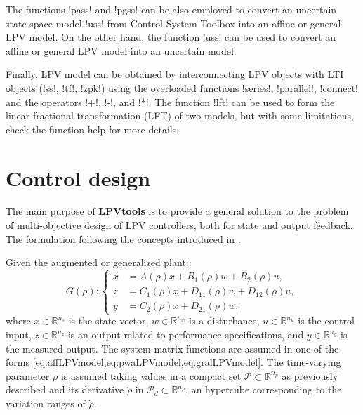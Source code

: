 \documentclass[fleqn,11pt]{article}
\newcommand{\p}{\rho}
\newcommand{\Rset}{\mathbb{R}}
\newcommand{\Pset}{\mathcal{P}}
\newcommand{\Pdset}{\mathcal{P}_d}
\newcommand{\lpvtool}{\textbf{LPVtools}\xspace}
\begin{document}
The functions !pass! and !pgss! can be also employed to convert an uncertain state-space model !uss! from Control System Toolbox into an affine or general LPV model. On the other hand, the function !uss! can be used to convert an affine or general LPV model into an uncertain model.

Finally, LPV model can be obtained by interconnecting LPV objects with LTI objects (!ss!, !tf!, !zpk!) using the overloaded functions !series!, !parallel!, !connect! and the operators !+!, !-!, and !*!. The function !lft! can be used to form the linear fractional transformation (LFT) of two models, but with some limitations, check the function help for more details.

\section{Control design}\label{sec:design}

The main purpose of \lpvtool is to provide a general solution to the problem of multi-objective design of LPV controllers, both for state and output feedback. The formulation following the concepts introduced in \cite{apkarian_advanced_1998,scherer_multiobjective_1997}.

Given the augmented or generalized plant:
\begin{equation*}
    G(\p): \left\{
    \begin{aligned}
        \dot{x} &= A(\p)x + B_1(\p)w + B_2(\p) u,\\
        z       &= C_1(\p)x + D_{11}(\p)w + D_{12}(\p) u,\\
        y       &= C_{2}(\p)x + D_{21}(\p)w,
    \end{aligned}
    \right.
\end{equation*}
where $x\in\Rset^{n_s}$ is the state vector, $w\in\Rset^{n_w}$ is a disturbance, $u\in\Rset^{n_u}$ is the control input, $z\in\Rset^{n_z}$ is an output related to performance specifications, and $y\in\Rset^{n_y}$ is the measured output. The system matrix functions are assumed in one of the forms \cref{eq:affLPVmodel,eq:pwaLPVmodel,eq:gralLPVmodel}. The time-varying parameter $\p$ is assumed taking values in a compact set $\Pset\subset\Rset^{n_p}$ as previously described and its derivative $\dot\p$ in $\Pdset\subset\Rset^{n_p}$, an hypercube corresponding to the variation ranges of $\dot\p$.
\end{document}
